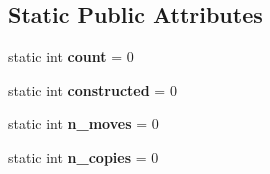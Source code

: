 \subsection*{Static Public Attributes}
\begin{DoxyCompactItemize}
\item 
\mbox{\label{struct_a_aefb3b36e6c35060bd6231268586a9428}} 
static int {\bfseries count} = 0
\item 
\mbox{\label{struct_a_a300e78ad85995331775b5f0cba340bca}} 
static int {\bfseries constructed} = 0
\item 
\mbox{\label{struct_a_a46585d60a484c4caae4901de9bf18dae}} 
static int {\bfseries n\+\_\+moves} = 0
\item 
\mbox{\label{struct_a_aa0c53d38c45a66b5c783f899d43415c2}} 
static int {\bfseries n\+\_\+copies} = 0
\end{DoxyCompactItemize}
